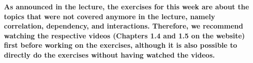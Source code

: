 \documentclass[a4paper]{article}
\begin{document}

\textbf{As announced in the lecture, the exercises for this week are about the topics that were not covered anymore in the lecture, namely correlation, dependency, and interactions. Therefore, we recommend watching the respective videos (Chapters 1.4 and 1.5 on the website) first before working on the exercises, although it is also possible to directly do the exercises without having watched the videos.}

\vspace*{1cm}



\dlz



\dlz


\end{document}
